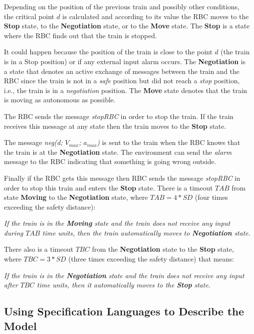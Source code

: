 \documentclass{template/openetcs_article}
\begin{document}
Depending on the position of the previous train and possibly other conditions, the critical point $d$ is calculated and according to its value the RBC moves to the \textbf{Stop} state, to the \textbf{Negotiation} state, or to the \textbf{Move} state. The \textbf{Stop} is a state where the RBC finds out that the train is stopped.

It could happen because the position of the train is close to the point $d$ (the train is in a Stop position) or if any external input alarm occurs. The \textbf{Negotiation} is a state that denotes an active exchange of messages between the train and the RBC since the train is not in a \textit{safe} position but did not reach a \textit{stop} position, i.e., the train is in a \textit{negotiation} position. The \textbf{Move} state denotes that the train is moving as autonomous as possible.

The RBC sends the message \textit{stopRBC} in order to stop the train. If the train receives this message at any state then the train moves to the \textbf{Stop} state. 

The message \textit{neg(d; $V_{max}$; $a_{max}$)} is sent to the train when the RBC knows that the train is at the \textbf{Negotiation} state. The environment can send the \textit{alarm} message to the RBC indicating that something is going wrong outside. 

Finally if the RBC gets this message then RBC sends the message \textit{stopRBC} in order to stop this train and enters the \textbf{Stop} state. There is a timeout $TAB$ from state \textbf{Moving} to the \textbf{Negotiation} state, where $TAB = 4*SD$ (four times exceeding the safety distance): 

\textit{If the train is in the \textbf{Moving} state and the train does not receive any input during $TAB$ time units, then the train automatically moves to \textbf{Negotiation} state.}

There also is a timeout $TBC$ from the \textbf{Negotiation} state to the \textbf{Stop} state, where $TBC = 3*SD$ (three times exceeding the safety distance) that means:

\textit{If the train is in the \textbf{Negotiation} state and the train does not receive any input after $TBC$ time units, then it automatically moves to the \textbf{Stop} state.}



\subsection{Using Specification Languages to Describe the Model}
\label{sec:spec}
\end{document}
